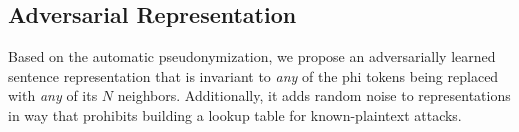 \subsection{Adversarial Representation}\label{sec:adversarial-representation}
%
Based on the automatic pseudonymization, we propose an adversarially learned sentence representation that is invariant to \textit{any} of the \ac{phi} tokens being replaced with \textit{any} of its $N$ neighbors.
%
Additionally, it adds random noise to representations in way that prohibits building a lookup table for known-plaintext attacks.


